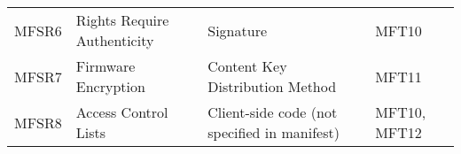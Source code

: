 \begin{longtable}[]{@{}llll@{}}
\begin{minipage}[t]{0.16\columnwidth}\raggedright\strut
MFSR6\strut
\end{minipage} & \begin{minipage}[t]{0.29\columnwidth}\raggedright\strut
Rights Require Authenticity\strut
\end{minipage} & \begin{minipage}[t]{0.34\columnwidth}\raggedright\strut
Signature\strut
\end{minipage} & \begin{minipage}[t]{0.10\columnwidth}\raggedright\strut
MFT10\strut
\end{minipage}\tabularnewline
\begin{minipage}[t]{0.16\columnwidth}\raggedright\strut
MFSR7\strut
\end{minipage} & \begin{minipage}[t]{0.29\columnwidth}\raggedright\strut
Firmware Encryption\strut
\end{minipage} & \begin{minipage}[t]{0.34\columnwidth}\raggedright\strut
Content Key Distribution Method\strut
\end{minipage} & \begin{minipage}[t]{0.10\columnwidth}\raggedright\strut
MFT11\strut
\end{minipage}\tabularnewline
\begin{minipage}[t]{0.16\columnwidth}\raggedright\strut
MFSR8\strut
\end{minipage} & \begin{minipage}[t]{0.29\columnwidth}\raggedright\strut
Access Control Lists\strut
\end{minipage} & \begin{minipage}[t]{0.34\columnwidth}\raggedright\strut
Client-side code (not specified in manifest)\strut
\end{minipage} & \begin{minipage}[t]{0.10\columnwidth}\raggedright\strut
MFT10, MFT12\strut
\end{minipage}\tabularnewline
\bottomrule
\end{longtable}

